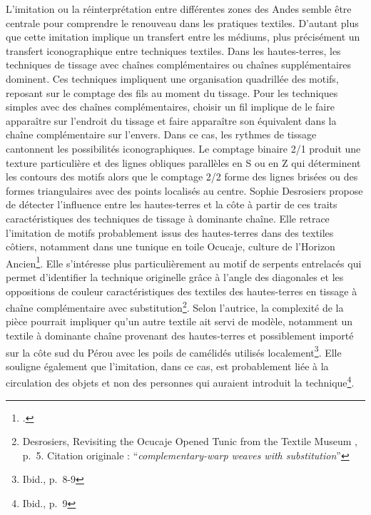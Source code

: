 L'imitation ou la réinterprétation entre différentes zones des Andes semble être centrale pour comprendre le renouveau dans les pratiques textiles. D'autant plus que cette imitation implique un transfert entre les médiums, plus précisément un transfert iconographique entre techniques textiles. Dans les hautes-terres, les techniques de tissage avec chaînes complémentaires ou chaînes supplémentaires dominent. Ces techniques impliquent une organisation quadrillée des motifs, reposant sur le comptage des fils au moment du tissage. Pour les techniques simples avec des chaînes complémentaires, choisir un fil implique de le faire apparaître sur l'endroit du tissage et faire apparaître son équivalent dans la chaîne complémentaire sur l'envers. Dans ce cas, les rythmes de tissage cantonnent les possibilités iconographiques. Le comptage binaire 2/1 produit une texture particulière et des lignes obliques parallèles en S ou en Z qui déterminent les contours des motifs alors que le comptage 2/2 forme des lignes brisées ou des formes triangulaires avec des points localisés au centre.
Sophie Desrosiers propose de détecter l'influence entre les hautes-terres et la côte à partir de ces traits caractéristiques des techniques de tissage à dominante chaîne. Elle retrace l'imitation de motifs probablement issus des hautes-terres dans des textiles côtiers, notamment dans une tunique en toile Ocucaje, culture de l'Horizon Ancien\footcite{desrosiersRevisitingOcucajeOpened2008}. Elle s'intéresse plus particulièrement au motif de serpents entrelacés qui permet d'identifier la technique originelle grâce à l'angle des diagonales et les oppositions de couleur caractéristiques des textiles des hautes-terres en \og tissage à chaîne complémentaire avec substitution\fg\footnote{Desrosiers, \og Revisiting the Ocucaje Opened Tunic from the Textile Museum \fg, p.~5. Citation originale : \textquotedblleft \textit{complementary-warp weaves with substitution}\textquotedblright}. Selon l'autrice, la complexité de la pièce pourrait impliquer qu'un autre textile ait servi de modèle, notamment un textile à dominante chaîne provenant des hautes-terres et possiblement importé sur la côte sud du Pérou avec les poils de camélidés utilisés localement\footnote{Ibid., p.~8-9}. Elle souligne également que l'imitation, dans ce cas, est probablement liée à la circulation des objets et non des personnes qui auraient introduit la technique\footnote{Ibid., p.~9}. 

